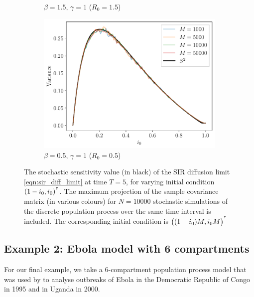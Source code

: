 \begin{figure}
\begin{center}
\begin{subfigure}{0.49\textwidth}
			\caption{\(\beta = 1.5\), \(\gamma = 1\) (\(R_0 = 1.5\))}
		\end{subfigure}\begin{subfigure}{0.49\textwidth}
			\includegraphics[width=\textwidth]{chp06_applications/figures/sir/sir_s2_0.5_1.0.pdf}
			\caption{\(\beta = 0.5\), \(\gamma = 1\) (\(R_0 = 0.5\))}
		\end{subfigure}
		\caption{The stochastic sensitivity value (in black) of the SIR diffusion limit \cref{eqn:sir_diff_limit} at time \(T = 5\), for varying initial condition \((1 - i_0, i_0)^{^{\intercal}}\).
			The maximum projection of the sample covariance matrix (in various colours) for \(N = 10000\) stochastic simulations of the discrete population process over the same time interval is included.
			The corresponding initial condition is \(\left((1 - i_0)M, i_0 M\right)^{^{\intercal}}\)}
		\label{fig:}
	\end{center}
\end{figure}






\subsection{Example 2: Ebola model with 6 compartments}\label{sec:epi_5d}
For our final example, we take a 6-compartment population process model that was used by \citet{LegrandEtAl_2007_UnderstandingDynamicsEbola} to analyse outbreaks of Ebola in the Democratic Republic of Congo in 1995 and in Uganda in 2000.



